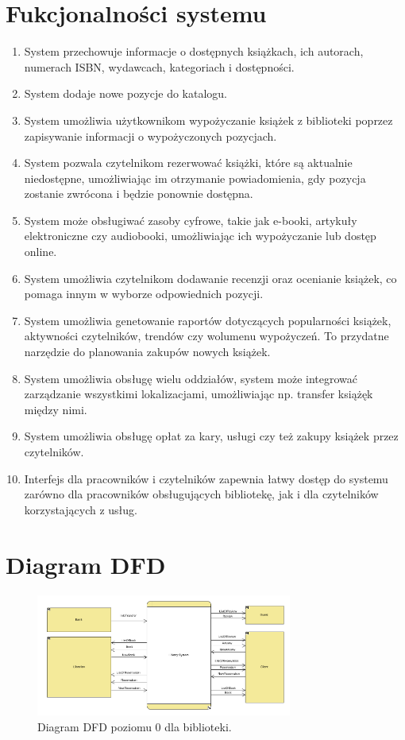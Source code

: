 \documentclass[12pt]{article}
\begin{document}
\section{Fukcjonalności systemu}
\begin{enumerate}
    \item System przechowuje informacje o dostępnych książkach, ich autorach, numerach ISBN, wydawcach, kategoriach i dostępności.
    \item System dodaje nowe pozycje do katalogu.
    \item System umożliwia użytkownikom wypożyczanie książek z biblioteki poprzez zapisywanie informacji o wypożyczonych pozycjach.
    \item System pozwala czytelnikom rezerwować książki, które są aktualnie niedostępne, umożliwiając im otrzymanie powiadomienia, gdy pozycja zostanie zwrócona i będzie ponownie dostępna.
    \item System może obsługiwać zasoby cyfrowe, takie jak e-booki, artykuły elektroniczne czy audiobooki, umożliwiając ich wypożyczanie lub dostęp online.
    \item System umożliwia czytelnikom dodawanie recenzji oraz ocenianie książek, co pomaga innym w wyborze odpowiednich pozycji.
    \item System umożliwia genetowanie raportów dotyczących popularności książek, aktywności czytelników, trendów czy wolumenu wypożyczeń. To przydatne narzędzie do planowania zakupów nowych książek.
    \item System umożliwia obsługę wielu oddziałów, system może integrować zarządzanie wszystkimi lokalizacjami, umożliwiając np. transfer książęk między nimi.
    \item System umożliwia obsługę opłat za kary, usługi czy też zakupy książek przez czytelników.
    \item Interfejs dla pracowników i czytelników zapewnia łatwy dostęp do systemu zarówno dla pracowników obsługujących bibliotekę, jak i dla czytelników korzystających z usług.
\end{enumerate}
\newpage
\section{Diagram DFD}
\begin{figure}[!h]
    \centering
    \includegraphics[width=0.75\textwidth]{Schemat}
    \caption{Diagram DFD  poziomu 0 dla biblioteki.}
\end{figure}
\end{document}
